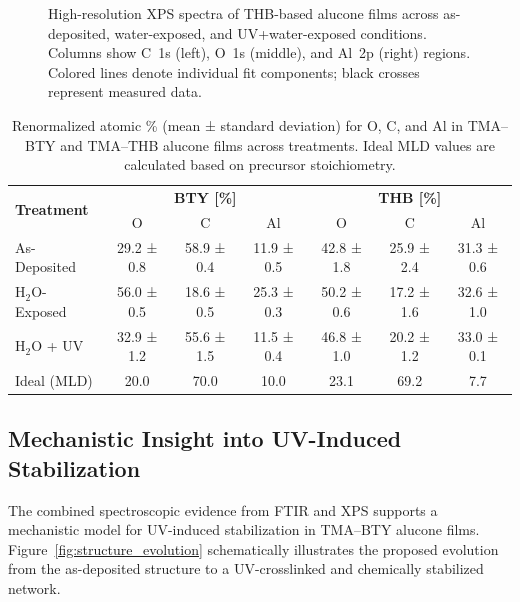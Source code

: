 \begin{figure}[H]
  \centering
  \begin{center}
  \end{center}
  \caption{High-resolution XPS spectra of THB-based alucone films across as-deposited, water-exposed, and UV+water-exposed conditions. Columns show C~1s (left), O~1s (middle), and Al~2p (right) regions. Colored lines denote individual fit components; black crosses represent measured data.}
  \label{fig:xps_thb}
\end{figure}

\begin{table}[H]
\centering
\caption{Renormalized atomic \% (mean ± standard deviation) for O, C, and Al in TMA–BTY and TMA–THB alucone films across treatments. Ideal MLD values are calculated based on precursor stoichiometry.}
\label{tab:xps-bty-thb-corrected-final}
\begin{tabular}{l c c c c c c}
\toprule
\multirow{2}{*}{\textbf{Treatment}} & \multicolumn{3}{c}{\textbf{BTY [\%]}} & \multicolumn{3}{c}{\textbf{THB [\%]}} \\
\cmidrule(lr){2-4} \cmidrule(lr){5-7}
 & O & C & Al & O & C & Al \\
\midrule
As-Deposited & 29.2 ± 0.8 & 58.9 ± 0.4 & 11.9 ± 0.5 & 42.8 ± 1.8 & 25.9 ± 2.4 & 31.3 ± 0.6 \\
H$_2$O-Exposed & 56.0 ± 0.5 & 18.6 ± 0.5 & 25.3 ± 0.3 & 50.2 ± 0.6 & 17.2 ± 1.6 & 32.6 ± 1.0 \\
H$_2$O + UV & 32.9 ± 1.2 & 55.6 ± 1.5 & 11.5 ± 0.4 & 46.8 ± 1.0 & 20.2 ± 1.2 & 33.0 ± 0.1 \\
\midrule
Ideal (MLD) & 20.0 & 70.0 & 10.0 & 23.1 & 69.2 & 7.7 \\
\bottomrule
\end{tabular}
\end{table}

\subsection{Mechanistic Insight into UV-Induced Stabilization}

The combined spectroscopic evidence from FTIR and XPS supports a mechanistic model for UV-induced stabilization in TMA–BTY alucone films. Figure~\ref{fig:structure_evolution} schematically illustrates the proposed evolution from the as-deposited structure to a UV-crosslinked and chemically stabilized network.

